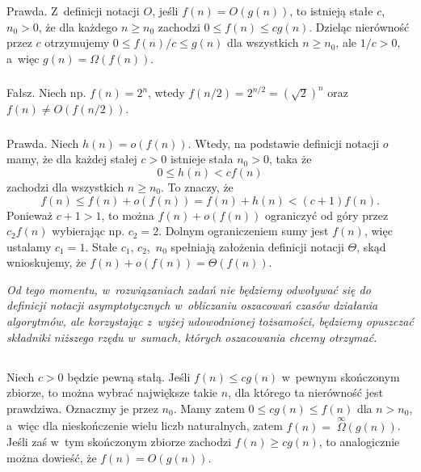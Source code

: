 \subsubsection{} %
Prawda. Z~definicji notacji $O$, jeśli $f(n)=O(g(n))$, to istnieją stałe $c$,~$n_0>0$, że dla każdego $n\ge n_0$ zachodzi $0\le f(n)\le cg(n)$. Dzieląc nierówność przez $c$ otrzymujemy $0\le f(n)/c\le g(n)$ dla wszystkich $n\ge n_0$, ale $1/c>0$, a~więc $g(n)=\Omega(f(n))$.

\subsubsection{} %
Fałsz. Niech np. $f(n)=2^n$, wtedy $f(n/2)=2^{n/2}=\left(\sqrt{2}\right)^n$ oraz $f(n)\ne O(f(n/2))$.

\subsubsection{} %
Prawda. Niech $h(n)=o(f(n))$. Wtedy, na podstawie definicji notacji $o$ mamy, że dla każdej stałej $c>0$ istnieje stała $n_0>0$, taka że
\[
	0 \le h(n) < cf(n)
\]
zachodzi dla wszystkich $n\ge n_0$. To znaczy, że
\[
	f(n) \le f(n)+o(f(n)) = f(n)+h(n) < (c+1)f(n).
\]
Ponieważ $c+1>1$, to można $f(n)+o(f(n))$ ograniczyć od góry przez $c_2f(n)$ wybierając np. $c_2=2$. Dolnym ograniczeniem sumy jest $f(n)$, więc ustalamy $c_1=1$. Stałe $c_1$, $c_2$,~$n_0$ spełniają założenia definicji notacji $\Theta$, skąd wnioskujemy, że $f(n)+o(f(n))=\Theta(f(n))$.

\bigskip
\noindent\emph{Od tego momentu, w~rozwiązaniach zadań nie będziemy odwoływać się do definicji notacji asymptotycznych w~obliczaniu oszacowań czasów działania algorytmów, ale korzystając z~wyżej udowodnionej tożsamości, będziemy opuszczać składniki niższego rzędu w~sumach, których oszacowania chcemy otrzymać.}

\subsection{} %

\subsubsection{} %
Niech $c>0$ będzie pewną stałą. Jeśli $f(n)\le cg(n)$ w~pewnym skończonym zbiorze, to można wybrać największe takie $n$, dla którego ta nierówność jest prawdziwa. Oznaczmy je przez $n_0$. Mamy zatem $0\le cg(n)\le f(n)$ dla $n>n_0$, a~więc dla nieskończenie wielu liczb naturalnych, zatem $f(n)=\;\stackrel{\infty}{\Omega}\!\!(g(n))$. Jeśli zaś w~tym skończonym zbiorze zachodzi $f(n)\ge cg(n)$, to analogicznie można dowieść, że $f(n)=O(g(n))$.

